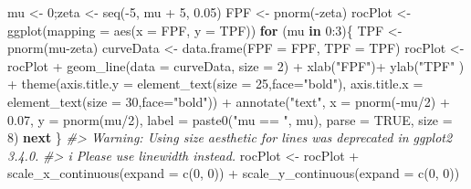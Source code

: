 \documentclass[
]{book}
\newenvironment{Shaded}{\begin{snugshade}}{\end{snugshade}}
\newcommand{\AttributeTok}[1]{\textcolor[rgb]{0.77,0.63,0.00}{#1}}
\newcommand{\CommentTok}[1]{\textcolor[rgb]{0.56,0.35,0.01}{\textit{#1}}}
\newcommand{\ConstantTok}[1]{\textcolor[rgb]{0.00,0.00,0.00}{#1}}
\newcommand{\ControlFlowTok}[1]{\textcolor[rgb]{0.13,0.29,0.53}{\textbf{#1}}}
\newcommand{\DecValTok}[1]{\textcolor[rgb]{0.00,0.00,0.81}{#1}}
\newcommand{\FloatTok}[1]{\textcolor[rgb]{0.00,0.00,0.81}{#1}}
\newcommand{\FunctionTok}[1]{\textcolor[rgb]{0.00,0.00,0.00}{#1}}
\newcommand{\NormalTok}[1]{#1}
\newcommand{\OtherTok}[1]{\textcolor[rgb]{0.56,0.35,0.01}{#1}}
\newcommand{\SpecialCharTok}[1]{\textcolor[rgb]{0.00,0.00,0.00}{#1}}
\newcommand{\StringTok}[1]{\textcolor[rgb]{0.31,0.60,0.02}{#1}}
\begin{document}
\begin{Shaded}
\begin{Highlighting}[]
\NormalTok{mu }\OtherTok{\textless{}{-}} \DecValTok{0}\NormalTok{;zeta }\OtherTok{\textless{}{-}} \FunctionTok{seq}\NormalTok{(}\SpecialCharTok{{-}}\DecValTok{5}\NormalTok{, mu }\SpecialCharTok{+} \DecValTok{5}\NormalTok{, }\FloatTok{0.05}\NormalTok{)}
\NormalTok{FPF }\OtherTok{\textless{}{-}} \FunctionTok{pnorm}\NormalTok{(}\SpecialCharTok{{-}}\NormalTok{zeta)}
\NormalTok{rocPlot }\OtherTok{\textless{}{-}} \FunctionTok{ggplot}\NormalTok{(}\AttributeTok{mapping =} \FunctionTok{aes}\NormalTok{(}\AttributeTok{x =}\NormalTok{ FPF, }\AttributeTok{y =}\NormalTok{ TPF))}
\ControlFlowTok{for}\NormalTok{ (mu }\ControlFlowTok{in} \DecValTok{0}\SpecialCharTok{:}\DecValTok{3}\NormalTok{)\{}
\NormalTok{  TPF }\OtherTok{\textless{}{-}} \FunctionTok{pnorm}\NormalTok{(mu}\SpecialCharTok{{-}}\NormalTok{zeta)}
\NormalTok{  curveData }\OtherTok{\textless{}{-}} \FunctionTok{data.frame}\NormalTok{(}\AttributeTok{FPF =}\NormalTok{ FPF, }\AttributeTok{TPF =}\NormalTok{ TPF)}
\NormalTok{  rocPlot }\OtherTok{\textless{}{-}}\NormalTok{ rocPlot }\SpecialCharTok{+} 
    \FunctionTok{geom\_line}\NormalTok{(}\AttributeTok{data =}\NormalTok{ curveData, }\AttributeTok{size =} \DecValTok{2}\NormalTok{) }\SpecialCharTok{+} 
    \FunctionTok{xlab}\NormalTok{(}\StringTok{"FPF"}\NormalTok{)}\SpecialCharTok{+} \FunctionTok{ylab}\NormalTok{(}\StringTok{"TPF"}\NormalTok{ ) }\SpecialCharTok{+} 
    \FunctionTok{theme}\NormalTok{(}\AttributeTok{axis.title.y =} \FunctionTok{element\_text}\NormalTok{(}\AttributeTok{size =} \DecValTok{25}\NormalTok{,}\AttributeTok{face=}\StringTok{"bold"}\NormalTok{),}
          \AttributeTok{axis.title.x =} \FunctionTok{element\_text}\NormalTok{(}\AttributeTok{size =} \DecValTok{30}\NormalTok{,}\AttributeTok{face=}\StringTok{"bold"}\NormalTok{))  }\SpecialCharTok{+}
    \FunctionTok{annotate}\NormalTok{(}\StringTok{"text"}\NormalTok{, }
             \AttributeTok{x =} \FunctionTok{pnorm}\NormalTok{(}\SpecialCharTok{{-}}\NormalTok{mu}\SpecialCharTok{/}\DecValTok{2}\NormalTok{) }\SpecialCharTok{+} \FloatTok{0.07}\NormalTok{, }
             \AttributeTok{y =} \FunctionTok{pnorm}\NormalTok{(mu}\SpecialCharTok{/}\DecValTok{2}\NormalTok{), }
             \AttributeTok{label =} \FunctionTok{paste0}\NormalTok{(}\StringTok{"mu == "}\NormalTok{, mu), }
             \AttributeTok{parse =} \ConstantTok{TRUE}\NormalTok{, }\AttributeTok{size =} \DecValTok{8}\NormalTok{)}
  \ControlFlowTok{next}
\NormalTok{\}}
\CommentTok{\#\textgreater{} Warning: Using \textasciigrave{}size\textasciigrave{} aesthetic for lines was deprecated in ggplot2 3.4.0.}
\CommentTok{\#\textgreater{} i Please use \textasciigrave{}linewidth\textasciigrave{} instead.}
\NormalTok{rocPlot }\OtherTok{\textless{}{-}}\NormalTok{ rocPlot }\SpecialCharTok{+}
  \FunctionTok{scale\_x\_continuous}\NormalTok{(}\AttributeTok{expand =} \FunctionTok{c}\NormalTok{(}\DecValTok{0}\NormalTok{, }\DecValTok{0}\NormalTok{)) }\SpecialCharTok{+} 
  \FunctionTok{scale\_y\_continuous}\NormalTok{(}\AttributeTok{expand =} \FunctionTok{c}\NormalTok{(}\DecValTok{0}\NormalTok{, }\DecValTok{0}\NormalTok{))     }


\end{Highlighting}
\end{Shaded}
\end{document}
